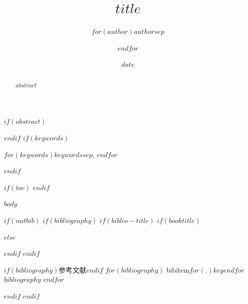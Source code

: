 \documentclass[$if(fontsize)$$fontsize$,$endif$]{article}
\title{$title$}
\author{$for(author)$$author$$sep$ \and $endfor$}
\date{$date$}
\begin{document}
$if(abstract)$
\begin{abstract}
$abstract$
\end{abstract}
$endif$
$if(keywords)$
\begin{IEEEkeywords}
$for(keywords)$$keywords$$sep$, $endfor$
\end{IEEEkeywords}
$endif$

\maketitle
$if(toc)$
\tableofcontents
$endif$

$body$

$if(natbib)$
$if(bibliography)$
$if(biblio-title)$
$if(booktitle)$
$else$
$endif$
$endif$
\begin{thebibliography}{$if(bibliography)$参考文献$endif$}
$for(bibliography)$
bibitem{$for(.)$$key$$endfor$} $bibliography$
$endfor$
\end{thebibliography}
$endif$
$endif$
\end{document}
